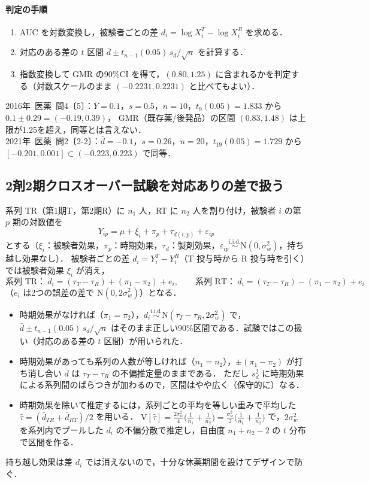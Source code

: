 \documentclass[a4paper,11pt,openany]{ltjsbook}
\newcommand{\kakomon}[2]{\mbox{#1年 医薬 問#2}}
\newcommand{\V}{\mathrm{V}}
\newcommand{\iid}{\overset{\text{i.i.d.}}{\sim}}
\newcommand{\Normal}{\mathrm{N}}
\begin{document}
\paragraph{判定の手順}
\begin{enumerate}
\item AUC を対数変換し，被験者ごとの差 $d_i=\log X_i^T-\log X_i^R$ を求める．
\item 対応のある差の $t$ 区間 $\bar d\pm t_{n-1}(0.05)\,s_d/\sqrt n$ を計算する．
\item 指数変換して GMR の90\%CI を得て，$(0.80,1.25)$ に含まれるかを判定する（対数スケールのまま $(-0.2231,0.2231)$ と比べてもよい）．
\end{enumerate}
\kakomon{2016}{4}〔5〕：$\bar Y=0.1$，$s=0.5$，$n=10$，$t_9(0.05)=1.833$ から $0.1\pm0.29=(-0.19,0.39)$，
GMR（既存薬/後発品）の区間 $(0.83,1.48)$ は上限が1.25を超え，同等とは言えない．\\
\kakomon{2021}{2}〔2-2〕：$\bar d=-0.1$，$s=0.26$，$n=20$，$t_{19}(0.05)=1.729$ から $[-0.201,0.001]\subset(-0.223,0.223)$ で同等．

\subsection{2剤2期クロスオーバー試験を対応ありの差で扱う}\label{subsec:13-crossover}
系列 TR（第1期T，第2期R）に $n_1$ 人，RT に $n_2$ 人を割り付け，被験者 $i$ の第 $p$ 期の対数値を
\[
Y_{ip}=\mu+\xi_i+\pi_p+\tau_{d(i,p)}+\varepsilon_{ip}
\]
とする（$\xi_i$：被験者効果，$\pi_p$：時期効果，$\tau_d$：製剤効果，$\varepsilon_{ip}\iid\Normal(0,\sigma_w^2)$，持ち越し効果なし）．
被験者ごとの差 $d_i=Y_i^T-Y_i^R$（T 投与時から R 投与時を引く）では被験者効果 $\xi_i$ が消え，
\[
\text{系列 TR：}\ d_i=(\tau_T-\tau_R)+(\pi_1-\pi_2)+e_i,\qquad
\text{系列 RT：}\ d_i=(\tau_T-\tau_R)-(\pi_1-\pi_2)+e_i
\]
（$e_i$ は2つの誤差の差で $\Normal(0,2\sigma_w^2)$）となる．
\begin{itemize}
\item 時期効果がなければ（$\pi_1=\pi_2$），$d_i\iid\Normal(\tau_T-\tau_R,2\sigma_w^2)$ で，$\bar d\pm t_{n-1}(0.05)\,s_d/\sqrt n$ はそのまま正しい90\%区間である．試験ではこの扱い（対応のある差の $t$ 区間）が用いられた．
\item 時期効果があっても系列の人数が等しければ（$n_1=n_2$），$\pm(\pi_1-\pi_2)$ が打ち消し合い $\bar d$ は $\tau_T-\tau_R$ の不偏推定量のままである．
      ただし $s_d^2$ に時期効果による系列間のばらつきが加わるので，区間はやや広く（保守的に）なる．
\item 時期効果を除いて推定するには，系列ごとの平均を等しい重みで平均した $\hat\tau=(\bar d_{TR}+\bar d_{RT})/2$ を用いる．
      $\V[\hat\tau]=\frac{2\sigma_w^2}{4}\bigl(\frac1{n_1}+\frac1{n_2}\bigr)=\frac{\sigma_w^2}{2}\bigl(\frac1{n_1}+\frac1{n_2}\bigr)$ で，$2\sigma_w^2$ を系列内でプールした $d_i$ の不偏分散で推定し，自由度 $n_1+n_2-2$ の $t$ 分布で区間を作る．
\end{itemize}
持ち越し効果は差 $d_i$ では消えないので，十分な休薬期間を設けてデザインで防ぐ．
\end{document}
